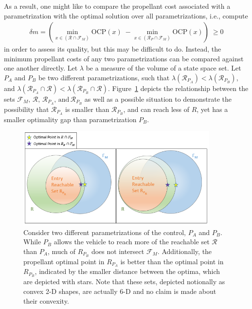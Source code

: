As a result, one might like to compare the propellant cost associated with a parametrization with the optimal solution over all parametrizations, i.e., compute
\begin{align}
\delta m = \left( \min_{x\in (\mathcal{R}\cap \mathcal{F}_M)} \mathrm{OCP}(x)\; - \min_{x\in (\mathcal{R}_P\cap \mathcal{F}_M)} \mathrm{OCP}(x) \right) \; \ge 0
\end{align}
in order to assess its quality, but this may be difficult to do. Instead, the minimum propellant costs of any two parametrizations can be compared against one another directly.  Let $\lambda$ be a measure of the volume of a state space set. Let $ P_A $ and  $ P_B $ be two different parametrizations, such that $\lambda(\mathcal{R}_{P_A}) < \lambda(\mathcal{R}_{P_B})$, and $\lambda(\mathcal{R}_{P_A}\cap \mathcal{R}) < \lambda(\mathcal{R}_{P_B}\cap \mathcal{R})$.
Figure~\ref{fig_sets} depicts the relationship between the sets $\mathcal{F}_M,\,\mathcal{R},\,\mathcal{R}_{P_A},\,\mathrm{and}\,\mathcal{R}_{P_B}$ as well as a possible situation to demonstrate the possibility that $ \mathcal{R}_{P_A} $ is smaller than $\mathcal{R}_{P_B}$, and can reach less of $R$, yet has a smaller optimality gap than parametrization $ P_B $. 
\begin{figure}[h!]
	\centering
	\includegraphics[width=0.9\textwidth]{../AAS20/SetDefinitions} 
	\caption{Consider two different parametrizations of the control, $ P_A $ and $ P_B $. While $ P_B $ allows the vehicle to reach more of the reachable set $\mathcal{R} $ than  $P_A$, much of $ R_{P_B}$ does not intersect $\mathcal{F}_M$. Additionally, the propellant optimal point in $ R_{P_A}$ is better than the optimal point in $ R_{P_B}$, indicated by the smaller distance between the optima, which are depicted with stars.  Note that these sets, depicted notionally as convex 2-D shapes, are actually 6-D and no claim is made about their convexity.}
	\label{fig_sets}
\end{figure}

